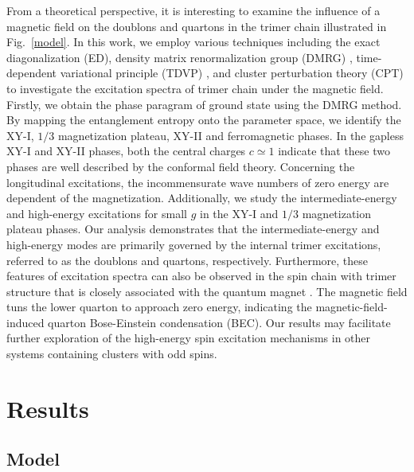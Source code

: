 \documentclass[aps,prx,showpacs,floatfix,twocolumn,superscriptaddress,nofootinbib,longbibliography]{revtex4-2}
\begin{document}
From a theoretical perspective, it is interesting to examine the influence  of a magnetic field on the doublons and quartons in the trimer chain illustrated in Fig.~\ref{model}. In this work, we employ various techniques including the  exact diagonalization (ED), density matrix renormalization group (DMRG) \cite{PhysRevLett.69.2863,PhysRevLett.93.076401,SCHOLLWOCK201196}, time-dependent variational principle (TDVP) \cite{PhysRevLett.107.070601, PhysRevB.94.165116},  and cluster perturbation theory (CPT) \cite{PhysRevB.48.418,PhysRevLett.84.522,RevModPhys.77.1027,PhysRevB.98.134410} to investigate the excitation spectra of trimer chain under the magnetic field. Firstly, we obtain the  phase paragram of ground state using the DMRG method. By mapping the entanglement entropy onto the parameter space,  we identify the  XY-I, $1/3$ magnetization plateau, XY-II and ferromagnetic phases. In the gapless XY-I and XY-II phases, both the central charges $c \simeq 1$ indicate that these two  phases   are well described by the  conformal field theory. Concerning the longitudinal excitations,  the incommensurate wave numbers of zero energy are dependent of the magnetization. Additionally,  we  study the intermediate-energy and high-energy excitations for small $g$  in the XY-I and $1/3$ magnetization plateau  phases. Our analysis demonstrates that  the intermediate-energy and high-energy modes are primarily governed by the internal trimer excitations,  referred to as the doublons and quartons, respectively. Furthermore, these features of excitation spectra can also be observed in the spin chain with trimer structure that is closely associated with the quantum magnet  \cite{bera2022emergent}. The magnetic field tuns the lower quarton to approach zero energy, indicating the magnetic-field-induced  quarton 
Bose-Einstein condensation (BEC).
Our results may facilitate further exploration of the high-energy spin excitation mechanisms in other systems containing clusters with odd spins.



   


\section{Results}

\subsection{Model}
\end{document}
